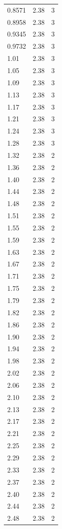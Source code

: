 \begin{longtable}{lrr}
  0.8571 & 2.38 & 3 \\
  0.8958 & 2.38 & 3 \\
  0.9345 & 2.38 & 3 \\
  0.9732 & 2.38 & 3 \\
  1.01 & 2.38 & 3 \\
  1.05 & 2.38 & 3 \\
  1.09 & 2.38 & 3 \\
  1.13 & 2.38 & 3 \\
  1.17 & 2.38 & 3 \\
  1.21 & 2.38 & 3 \\
  1.24 & 2.38 & 3 \\
  1.28 & 2.38 & 3 \\
  1.32 & 2.38 & 2 \\
  1.36 & 2.38 & 2 \\
  1.40 & 2.38 & 2 \\
  1.44 & 2.38 & 2 \\
  1.48 & 2.38 & 2 \\
  1.51 & 2.38 & 2 \\
  1.55 & 2.38 & 2 \\
  1.59 & 2.38 & 2 \\
  1.63 & 2.38 & 2 \\
  1.67 & 2.38 & 2 \\
  1.71 & 2.38 & 2 \\
  1.75 & 2.38 & 2 \\
  1.79 & 2.38 & 2 \\
  1.82 & 2.38 & 2 \\
  1.86 & 2.38 & 2 \\
  1.90 & 2.38 & 2 \\
  1.94 & 2.38 & 2 \\
  1.98 & 2.38 & 2 \\
  2.02 & 2.38 & 2 \\
  2.06 & 2.38 & 2 \\
  2.10 & 2.38 & 2 \\
  2.13 & 2.38 & 2 \\
  2.17 & 2.38 & 2 \\
  2.21 & 2.38 & 2 \\
  2.25 & 2.38 & 2 \\
  2.29 & 2.38 & 2 \\
  2.33 & 2.38 & 2 \\
  2.37 & 2.38 & 2 \\
  2.40 & 2.38 & 2 \\
  2.44 & 2.38 & 2 \\
  2.48 & 2.38 & 2 \\

\end{longtable}
